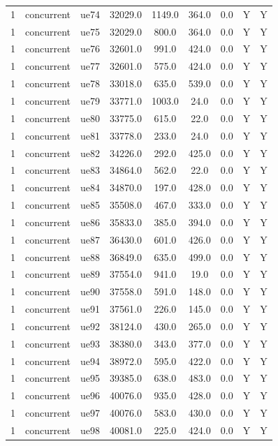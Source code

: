 \begin{table}[ht]
\begin{tabular}{|c|c|c|c|c|c|c|c|c|}
1 & concurrent & ue74 & 32029.0 & 1149.0 & 364.0 & 0.0 & Y & Y \\
1 & concurrent & ue75 & 32029.0 & 800.0 & 364.0 & 0.0 & Y & Y \\
1 & concurrent & ue76 & 32601.0 & 991.0 & 424.0 & 0.0 & Y & Y \\
1 & concurrent & ue77 & 32601.0 & 575.0 & 424.0 & 0.0 & Y & Y \\
1 & concurrent & ue78 & 33018.0 & 635.0 & 539.0 & 0.0 & Y & Y \\
1 & concurrent & ue79 & 33771.0 & 1003.0 & 24.0 & 0.0 & Y & Y \\
1 & concurrent & ue80 & 33775.0 & 615.0 & 22.0 & 0.0 & Y & Y \\
1 & concurrent & ue81 & 33778.0 & 233.0 & 24.0 & 0.0 & Y & Y \\
1 & concurrent & ue82 & 34226.0 & 292.0 & 425.0 & 0.0 & Y & Y \\
1 & concurrent & ue83 & 34864.0 & 562.0 & 22.0 & 0.0 & Y & Y \\
1 & concurrent & ue84 & 34870.0 & 197.0 & 428.0 & 0.0 & Y & Y \\
1 & concurrent & ue85 & 35508.0 & 467.0 & 333.0 & 0.0 & Y & Y \\
1 & concurrent & ue86 & 35833.0 & 385.0 & 394.0 & 0.0 & Y & Y \\
1 & concurrent & ue87 & 36430.0 & 601.0 & 426.0 & 0.0 & Y & Y \\
1 & concurrent & ue88 & 36849.0 & 635.0 & 499.0 & 0.0 & Y & Y \\
1 & concurrent & ue89 & 37554.0 & 941.0 & 19.0 & 0.0 & Y & Y \\
1 & concurrent & ue90 & 37558.0 & 591.0 & 148.0 & 0.0 & Y & Y \\
1 & concurrent & ue91 & 37561.0 & 226.0 & 145.0 & 0.0 & Y & Y \\
1 & concurrent & ue92 & 38124.0 & 430.0 & 265.0 & 0.0 & Y & Y \\
1 & concurrent & ue93 & 38380.0 & 343.0 & 377.0 & 0.0 & Y & Y \\
1 & concurrent & ue94 & 38972.0 & 595.0 & 422.0 & 0.0 & Y & Y \\
1 & concurrent & ue95 & 39385.0 & 638.0 & 483.0 & 0.0 & Y & Y \\
1 & concurrent & ue96 & 40076.0 & 935.0 & 428.0 & 0.0 & Y & Y \\
1 & concurrent & ue97 & 40076.0 & 583.0 & 430.0 & 0.0 & Y & Y \\
1 & concurrent & ue98 & 40081.0 & 225.0 & 424.0 & 0.0 & Y & Y \\

\end{tabular}
\end{table}

